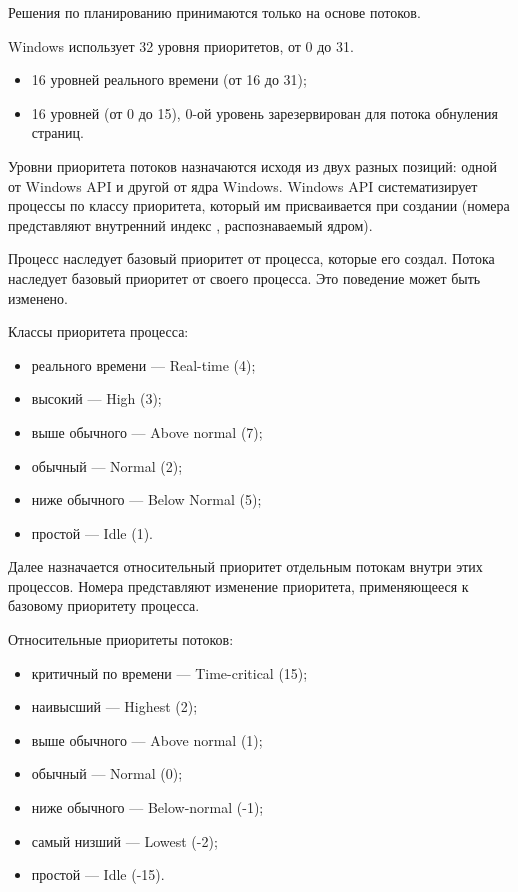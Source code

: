 Решения по планированию принимаются только на основе потоков.

Windows использует 32 уровня приоритетов, от 0 до 31.
\begin{itemize}
  \item 16 уровней реального времени (от 16 до 31);
  \item 16 уровней (от 0 до 15), 0-ой уровень зарезервирован для потока обнуления страниц.
\end{itemize}

Уровни приоритета потоков назначаются исходя из двух разных позиций:
одной от Windows API и другой от ядра Windows. Windows API 
систематизирует процессы по классу приоритета, который им 
присваивается при создании (номера представляют внутренний индекс 
, распознаваемый ядром).

Процесс наследует базовый приоритет от процесса, которые его создал. 
Потока наследует базовый приоритет от своего процесса. Это поведение
может быть изменено.

Классы приоритета процесса:
\begin{itemize}
  \item реального времени --- Real-time (4);
  \item высокий --- High (3);
  \item выше обычного --- Above normal (7);
  \item обычный --- Normal (2);
  \item ниже обычного --- Below Normal (5);
  \item простой --- Idle (1).
\end{itemize}

Далее назначается относительный приоритет отдельным потокам внутри 
этих процессов. Номера представляют изменение приоритета,
применяющееся к базовому приоритету процесса.

Относительные приоритеты потоков:
\begin{itemize}
  \item критичный по времени --- Time-critical (15);
  \item наивысший --- Highest (2);
  \item выше обычного --- Above normal (1);
  \item обычный --- Normal (0);
  \item ниже обычного --- Below-normal (-1);
  \item самый низший --- Lowest (-2);
  \item простой --- Idle (-15).
\end{itemize}

